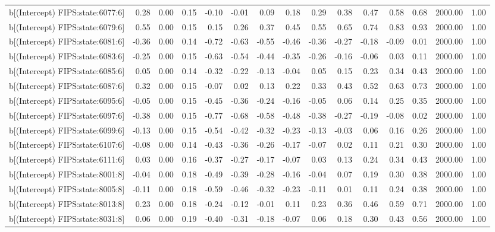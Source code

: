 \begin{table}[ht]
\begin{tabular}{rrrrrrrrrrrrrrr}
  b[(Intercept) FIPS:state:6077:6] & 0.28 & 0.00 & 0.15 & -0.10 & -0.01 & 0.09 & 0.18 & 0.29 & 0.38 & 0.47 & 0.58 & 0.68 & 2000.00 & 1.00 \\ 
  b[(Intercept) FIPS:state:6079:6] & 0.55 & 0.00 & 0.15 & 0.15 & 0.26 & 0.37 & 0.45 & 0.55 & 0.65 & 0.74 & 0.83 & 0.93 & 2000.00 & 1.00 \\ 
  b[(Intercept) FIPS:state:6081:6] & -0.36 & 0.00 & 0.14 & -0.72 & -0.63 & -0.55 & -0.46 & -0.36 & -0.27 & -0.18 & -0.09 & 0.01 & 2000.00 & 1.00 \\ 
  b[(Intercept) FIPS:state:6083:6] & -0.25 & 0.00 & 0.15 & -0.63 & -0.54 & -0.44 & -0.35 & -0.26 & -0.16 & -0.06 & 0.03 & 0.11 & 2000.00 & 1.00 \\ 
  b[(Intercept) FIPS:state:6085:6] & 0.05 & 0.00 & 0.14 & -0.32 & -0.22 & -0.13 & -0.04 & 0.05 & 0.15 & 0.23 & 0.34 & 0.43 & 2000.00 & 1.00 \\ 
  b[(Intercept) FIPS:state:6087:6] & 0.32 & 0.00 & 0.15 & -0.07 & 0.02 & 0.13 & 0.22 & 0.33 & 0.43 & 0.52 & 0.63 & 0.73 & 2000.00 & 1.00 \\ 
  b[(Intercept) FIPS:state:6095:6] & -0.05 & 0.00 & 0.15 & -0.45 & -0.36 & -0.24 & -0.16 & -0.05 & 0.06 & 0.14 & 0.25 & 0.35 & 2000.00 & 1.00 \\ 
  b[(Intercept) FIPS:state:6097:6] & -0.38 & 0.00 & 0.15 & -0.77 & -0.68 & -0.58 & -0.48 & -0.38 & -0.27 & -0.19 & -0.08 & 0.02 & 2000.00 & 1.00 \\ 
  b[(Intercept) FIPS:state:6099:6] & -0.13 & 0.00 & 0.15 & -0.54 & -0.42 & -0.32 & -0.23 & -0.13 & -0.03 & 0.06 & 0.16 & 0.26 & 2000.00 & 1.00 \\ 
  b[(Intercept) FIPS:state:6107:6] & -0.08 & 0.00 & 0.14 & -0.43 & -0.36 & -0.26 & -0.17 & -0.07 & 0.02 & 0.11 & 0.21 & 0.30 & 2000.00 & 1.00 \\ 
  b[(Intercept) FIPS:state:6111:6] & 0.03 & 0.00 & 0.16 & -0.37 & -0.27 & -0.17 & -0.07 & 0.03 & 0.13 & 0.24 & 0.34 & 0.43 & 2000.00 & 1.00 \\ 
  b[(Intercept) FIPS:state:8001:8] & -0.04 & 0.00 & 0.18 & -0.49 & -0.39 & -0.28 & -0.16 & -0.04 & 0.07 & 0.19 & 0.30 & 0.38 & 2000.00 & 1.00 \\ 
  b[(Intercept) FIPS:state:8005:8] & -0.11 & 0.00 & 0.18 & -0.59 & -0.46 & -0.32 & -0.23 & -0.11 & 0.01 & 0.11 & 0.24 & 0.38 & 2000.00 & 1.00 \\ 
  b[(Intercept) FIPS:state:8013:8] & 0.23 & 0.00 & 0.18 & -0.24 & -0.12 & -0.01 & 0.11 & 0.23 & 0.36 & 0.46 & 0.59 & 0.71 & 2000.00 & 1.00 \\ 
  b[(Intercept) FIPS:state:8031:8] & 0.06 & 0.00 & 0.19 & -0.40 & -0.31 & -0.18 & -0.07 & 0.06 & 0.18 & 0.30 & 0.43 & 0.56 & 2000.00 & 1.00 \\ 

\end{tabular}
\end{table}
